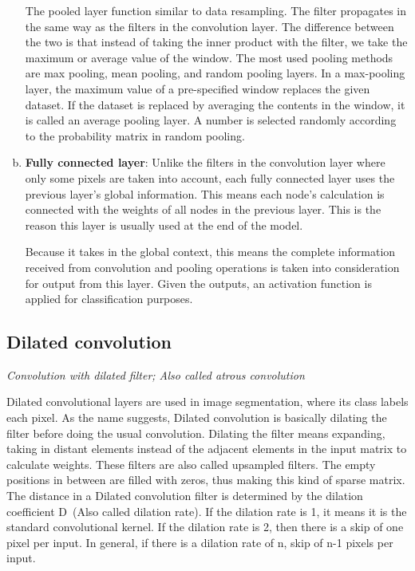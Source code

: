\begin{enumerate}[(a)]
        The pooled layer function similar to data resampling. The filter propagates in the same way as the filters in the convolution layer. The difference between the two is that instead of taking the inner product with the filter, we take the maximum or average value of the window. The most used pooling methods are max pooling, mean pooling, and random pooling layers. In a max-pooling layer, the maximum value of a pre-specified window replaces the given dataset. If the dataset is replaced by averaging the contents in the window, it is called an average pooling layer. A number is selected randomly according to the probability matrix in random pooling.

    \item \textbf{Fully connected layer}:
        Unlike the filters in the convolution layer where only some pixels are taken into account, each fully connected layer uses the previous layer's global information. This means each node’s calculation is connected with the weights of all nodes in the previous layer. This is the reason this layer is usually used at the end of the model. 

        Because it takes in the global context, this means the complete information received from convolution and pooling operations is taken into consideration for output from this layer. Given the outputs, an activation function is applied for classification purposes.
\end{enumerate}

\subsection{Dilated convolution}
\label{sec:Dilated_Convolution}
\textit{Convolution with dilated filter; Also called atrous convolution}

    Dilated convolutional layers are used in image segmentation, where its class labels each pixel. As the name suggests, Dilated convolution is basically dilating the filter before doing the usual convolution. Dilating the filter means expanding, taking in distant elements instead of the adjacent elements in the input matrix to calculate weights. These filters are also called upsampled filters. The empty positions in between are filled with zeros, thus making this kind of sparse matrix. The distance in a Dilated convolution filter is determined by the dilation coefficient D~(Also called dilation rate). If the dilation rate is 1, it means it is the standard convolutional kernel. If the dilation rate is 2, then there is a skip of one pixel per input. In general, if there is a dilation rate of n, skip of n-1 pixels per input.
    
